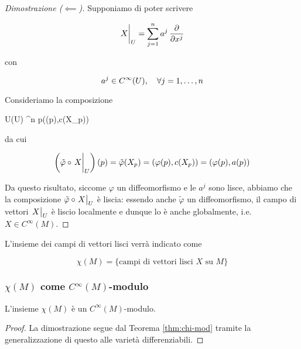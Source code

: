\begin{proof}[Dimostrazione ($ \impliedby $)]
	Supponiamo di poter scrivere
	
	\begin{equation}
		\eval{X}_{U} = \sum_{j=1}^{n} a^{j} \, \pdv{x^{j}}
	\end{equation}
	
	con
	
	\begin{equation}
		a^{j} \in C^{\infty}(U) \qcomma \forall j=1,\dots,n
	\end{equation}

	Consideriamo la composizione
	
		{U}{\varphi(U) \times \R^{n}}
		{p}{(\varphi(p),c(X_{p}))}

	da cui
	
	\begin{equation}
		\left( \tilde{\varphi} \circ \eval{X}_{U} \right)(p) = \tilde{\varphi}(X_{p}) %
		= (\varphi(p),c(X_{p})) %
		= (\varphi(p),a(p))
	\end{equation}

	Da questo risultato, siccome $ \varphi $  un diffeomorfismo e le $ a^{j} $ sono lisce, abbiamo che la composizione $ \tilde{\varphi} \circ \eval{X}_{U} $ è liscia: essendo anche $ \tilde{\varphi} $ un diffeomorfismo, il campo di vettori $ \eval{X}_{U} $ è liscio localmente e dunque lo è anche globalmente, i.e. $ X \in C^{\infty}(M) $.
\end{proof}

L'insieme dei campi di vettori lisci verrà indicato come

\begin{equation}
	\chi(M) = \{ \text{campi di vettori lisci } X \text{ su } M \}
\end{equation}

\subsubsection{$ \chi(M) $ come $ C^{\infty}(M) $-modulo}

\begin{definition}
	L'insieme $ \chi(M) $ è un $ C^{\infty}(M) $-modulo.
\end{definition}

\begin{proof}
	La dimostrazione segue dal Teorema \ref{thm:chi-mod} tramite la generalizzazione di questo alle varietà differenziabili.
\end{proof}

